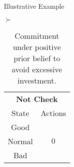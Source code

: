 \documentclass[usenames,dvipsnames,aspectratio=169,11pt, envcountsect, handout]{beamer}
\begin{document}
\begin{frame}[noframenumbering]{Illustrative Example}
\begin{table}[H]
\begin{minipage}{0.29\textwidth}
		\end{minipage}\hspace{0.3cm} %
		\( \succ \) %
		\begin{minipage}{0.29\textwidth}
			\centering
			\begin{tabular}{c | c}
				\multicolumn{2}{c}{\textbf{Not Check}} \\
				State  & Actions                       \\
				\hline
				Good   & \multirow{3}{*}{ \( 0 \)}     \\
				Normal &                               \\
				Bad    &                               \\
			\end{tabular}
			\vspace{0.5cm} %
		\end{minipage}
		\caption{Commitment under positive prior belief to avoid excessive investment.} %
		\label{tab:commitment}
	\end{table}



\end{frame}
\end{document}
